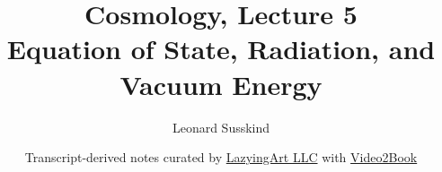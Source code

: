 \documentclass[11pt,oneside]{book}
\begin{document}
\hypersetup{pageanchor=false}
\frontmatter
\title{Cosmology, Lecture 5\\Equation of State, Radiation, and Vacuum Energy}
\author{Leonard Susskind}
\date{Transcript-derived notes curated by \href{https://lazying.art}{LazyingArt LLC} with \href{https://github.com/lachlanchen/Video2Book}{Video2Book}}
\maketitle
\hypersetup{pageanchor=true}
\mainmatter

\end{document}
